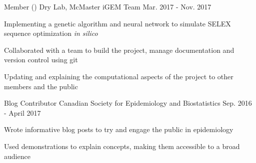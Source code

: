 \begin{cventries}
	\cventry
      {Member ()}
      {Dry Lab, McMaster iGEM Team}
      {Mar. 2017 - Nov. 2017}
      {}%
      {
        \begin{cvitems}
          \item{Implementing a genetic algorithm and neural network to simulate SELEX sequence optimization \textit{in silico}}
          \item{Collaborated with a team to build the project, manage documentation and version control using git}
          \item{Updating and explaining the computational aspects of the project to other members and the public}
        \end{cvitems}
      }
  \cventry
    {Blog Contributor} %
    {Canadian Society for Epidemiology and Biostatistics}
    {} %
    {Sep. 2016 - April 2017} %
    {
      \begin{cvitems}
        \item{Wrote informative blog posts to try and engage the public in epidemiology}
        \item{Used demonstrations to explain concepts, making them accessible to a broad audience}
      \end{cvitems}
    }

\end{cventries}
